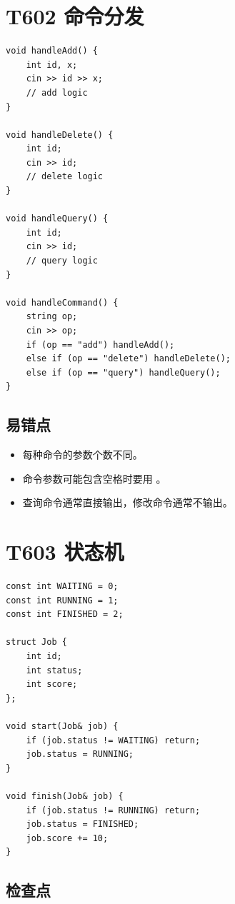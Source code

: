 \section{T602 命令分发}\label{sec:09-42}\label{tpl:602}

\begin{lstlisting}
void handleAdd() {
    int id, x;
    cin >> id >> x;
    // add logic
}

void handleDelete() {
    int id;
    cin >> id;
    // delete logic
}

void handleQuery() {
    int id;
    cin >> id;
    // query logic
}

void handleCommand() {
    string op;
    cin >> op;
    if (op == "add") handleAdd();
    else if (op == "delete") handleDelete();
    else if (op == "query") handleQuery();
}
\end{lstlisting}

\subsection{易错点}

\begin{itemize}
  \item 每种命令的参数个数不同。
  \item 命令参数可能包含空格时要用 。
  \item 查询命令通常直接输出，修改命令通常不输出。
\end{itemize}

\section{T603 状态机}\label{sec:09-43}\label{tpl:603}

\begin{lstlisting}
const int WAITING = 0;
const int RUNNING = 1;
const int FINISHED = 2;

struct Job {
    int id;
    int status;
    int score;
};

void start(Job& job) {
    if (job.status != WAITING) return;
    job.status = RUNNING;
}

void finish(Job& job) {
    if (job.status != RUNNING) return;
    job.status = FINISHED;
    job.score += 10;
}
\end{lstlisting}

\subsection{检查点}

